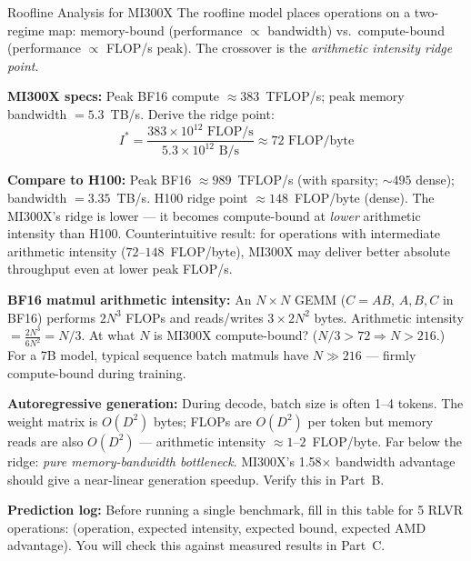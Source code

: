 \begin{thinkfirst}{Roofline Analysis for MI300X}
The roofline model places operations on a two-regime map: memory-bound (performance $\propto$ bandwidth) vs.\ compute-bound (performance $\propto$ FLOP/s peak). The crossover is the \textit{arithmetic intensity ridge point}.

\textbf{MI300X specs:} Peak BF16 compute $\approx 383$~TFLOP/s; peak memory bandwidth $= 5.3$~TB/s. Derive the ridge point:
$$I^* = \frac{383 \times 10^{12} \text{ FLOP/s}}{5.3 \times 10^{12} \text{ B/s}} \approx 72 \text{ FLOP/byte}$$

\textbf{Compare to H100:} Peak BF16 $\approx 989$~TFLOP/s (with sparsity; $\sim 495$ dense); bandwidth $= 3.35$~TB/s. H100 ridge point $\approx 148$~FLOP/byte (dense). The MI300X's ridge is lower --- it becomes compute-bound at \textit{lower} arithmetic intensity than H100. Counterintuitive result: for operations with intermediate arithmetic intensity ($72$--$148$~FLOP/byte), MI300X may deliver better absolute throughput even at lower peak FLOP/s.

\textbf{BF16 matmul arithmetic intensity:} An $N \times N$ GEMM ($C = AB$, $A,B,C$ in BF16) performs $2N^3$ FLOPs and reads/writes $3 \times 2N^2$ bytes. Arithmetic intensity $= \frac{2N^3}{6N^2} = N/3$. At what $N$ is MI300X compute-bound? ($N/3 > 72 \Rightarrow N > 216$.) For a 7B model, typical sequence batch matmuls have $N \gg 216$ --- firmly compute-bound during training.

\textbf{Autoregressive generation:} During decode, batch size is often 1--4 tokens. The weight matrix is $O(D^2)$ bytes; FLOPs are $O(D^2)$ per token but memory reads are also $O(D^2)$ --- arithmetic intensity $\approx 1$--$2$~FLOP/byte. Far below the ridge: \textit{pure memory-bandwidth bottleneck}. MI300X's 1.58$\times$ bandwidth advantage should give a near-linear generation speedup. Verify this in Part~B.

\textbf{Prediction log:} Before running a single benchmark, fill in this table for 5 RLVR operations: (operation, expected intensity, expected bound, expected AMD advantage). You will check this against measured results in Part~C.
\end{thinkfirst}

